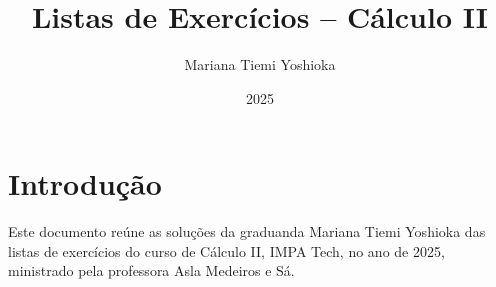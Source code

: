 \documentclass[a4paper,12pt]{article}
\title{Listas de Exercícios -- Cálculo II}
\author{Mariana Tiemi Yoshioka}
\date{2025}
\begin{document}
	
	\maketitle
	\tableofcontents
	
	\section*{Introdução}
	Este documento reúne as soluções da graduanda Mariana Tiemi Yoshioka das listas de exercícios do curso de Cálculo II, IMPA Tech, no ano de 2025, ministrado pela professora Asla Medeiros e Sá.
	
	\newpage
	
	
	
	
	
\end{document}
